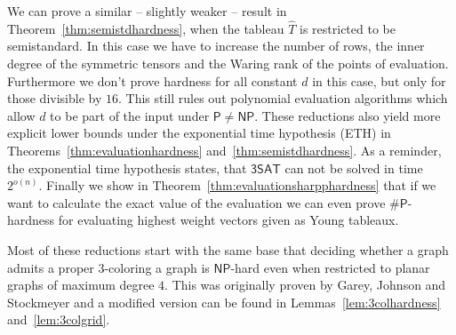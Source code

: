 \documentclass[10pt,a4paper]{article}
\numberwithin{equation}{section}
\theoremstyle{definition}
\newcommand{\PP}{\ensuremath{\mathsf{P}}}
\newcommand{\NP}{\ensuremath{\mathsf{NP}}}
\newcommand{\SAT}{\ensuremath{\mathsf{3SAT}}}
\begin{document}
We can prove a similar -- slightly weaker -- result in Theorem~\ref{thm:semistdhardness}, when the tableau $\hat{T}$ is restricted to be semistandard.
In this case we have to increase the number of rows, the inner degree of the symmetric tensors and the Waring rank of the points of evaluation.
Furthermore we don't prove hardness for all constant $d$ in this case, but only for those divisible by $16$.
This still rules out polynomial evaluation algorithms which allow $d$ to be part of the input under $\PP \neq \NP$.
These reductions also yield more explicit lower bounds under the exponential time hypothesis (ETH) in Theorems~\ref{thm:evaluationhardness} and~\ref{thm:semistdhardness}.
As a reminder, the exponential time hypothesis states, that $\SAT$ can not be solved in time $2^{o(n)}$.
Finally we show in Theorem~\ref{thm:evaluationsharpphardness} that if we want to calculate the exact value of the evaluation we can even prove $\#\PP$-hardness for evaluating highest weight vectors given as Young tableaux.

Most of these reductions start with the same base that deciding whether a graph admits a proper $3$-coloring a graph is $\NP$-hard even when restricted to planar graphs of maximum degree $4$.
This was originally proven by Garey, Johnson and Stockmeyer \cite{DBLP:journals/tcs/GareyJS76} and a modified version can be found in Lemmas~\ref{lem:3colhardness} and~\ref{lem:3colgrid}.
\end{document}
